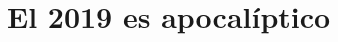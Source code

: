 \documentclass[a4paper,12pt,twoside]{book}
\begin{document}
\chapter{El 2019 es apocalíptico}
\label{190101}

% 
% 
\end{document}
